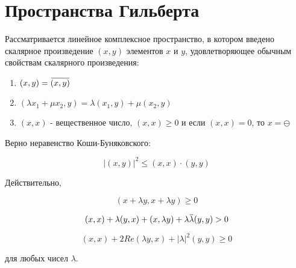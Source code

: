\documentclass[12pt,a4paper,titlepage]{book}
\newcommand{\overbar}[1]{\mkern 1.5mu\overline{\mkern-1.5mu#1\mkern-1.5mu}\mkern 1.5mu}
\theoremstyle{definition}
\theoremstyle{plain}
\theoremstyle{remark}
\theoremstyle{plain}
\begin{document}
\section{Пространства Гильберта}

Рассматривается линейное комплексное пространство, в котором введено скалярное произведение $(x, y)$ элементов $x$ и $y$, удовлетворяющее обычным свойствам скалярного произведения:

\begin{enumerate}

    \item $(x, y) = \overbar{(x, y)}$

    \item $(\lambda x_1 + \mu x_2, y) = \lambda (x_1, y) + \mu (x_2, y)$

    \item $(x, x)$ - вещественное число, $(x, x) \geqslant 0$ и если $(x, x) = 0$, то $x = \ominus$

\end{enumerate}

Верно неравенство Коши-Буняковского:

$$|(x, y)|^2 \le (x, x) \cdot (y, y)$$

Действительно, 

$$(x + \lambda y, x + \lambda y) \ge 0$$

$$(x, x) + \lambda (y, x) + (x, \lambda y) + \lambda \overbar{\lambda} (y, y) > 0$$

$$(x,x) + 2 Re(\lambda y, x) + |\lambda|^2 (y, y) \ge 0$$

для любых чисел $\lambda$.
\end{document}
